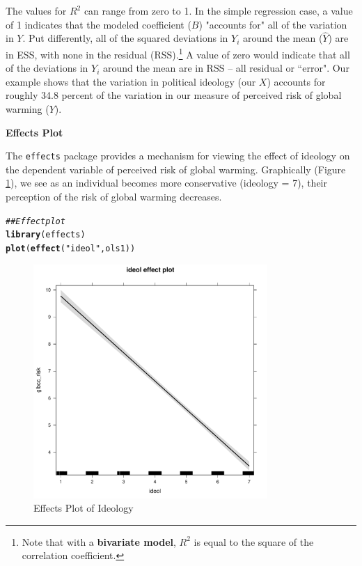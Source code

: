 \documentclass[11pt,openany]{book}\usepackage[]{graphicx}\usepackage[]{color}
\makeatletter
\newcommand{\hlstr}[1]{\textcolor[rgb]{0.192,0.494,0.8}{#1}}%
\newcommand{\hlcom}[1]{\textcolor[rgb]{0.678,0.584,0.686}{\textit{#1}}}%
\newcommand{\hlstd}[1]{\textcolor[rgb]{0.345,0.345,0.345}{#1}}%
\newcommand{\hlkwd}[1]{\textcolor[rgb]{0.737,0.353,0.396}{\textbf{#1}}}%
\newenvironment{kframe}{%
 \def\at@end@of@kframe{}%
 \ifinner\ifhmode%
  \def\at@end@of@kframe{\end{minipage}}%
  \begin{minipage}{\columnwidth}%
 \fi\fi%
 \def\FrameCommand##1{\hskip\@totalleftmargin \hskip-\fboxsep
 \colorbox{shadecolor}{##1}\hskip-\fboxsep
     \hskip-\linewidth \hskip-\@totalleftmargin \hskip\columnwidth}%
 \MakeFramed {\advance\hsize-\width
   \@totalleftmargin\z@ \linewidth\hsize
   \@setminipage}}%
 {\par\unskip\endMakeFramed%
 \at@end@of@kframe}
\newenvironment{knitrout}{}{} %
\renewenvironment{knitrout}{\begin{singlespace}}{\end{singlespace}}
\makeatother
\begin{document}
The values for $R^{2}$ can range from zero to 1. In the simple regression case, a value of 1 indicates that the modeled coefficient ($B$) "accounts for" all of the variation in $Y$. Put differently, all of the squared deviations in $Y_{i}$ around the mean ($\hat{Y}$) are in ESS, with none in the residual (RSS).\footnote{Note that with a \textbf{bivariate model}, $R^{2}$ is equal to the square of the correlation coefficient.} A value of zero would indicate that all of the  deviations in $Y_{i}$ around the mean are in RSS -- all residual or ``error". Our example shows that the variation in political ideology (our $X$) accounts for roughly 34.8 percent of the variation in our measure of perceived risk of global warming ($Y$). 

\noindent  \textbf{Effects Plot}

The \texttt{effects} package provides a mechanism for viewing the effect of ideology on the dependent variable of perceived risk of global warming.  Graphically (Figure \ref{fig:effectsplot}), we see as an individual becomes more conservative (ideology = 7), their perception of the risk of global warming decreases.

\begin{knitrout}
\color{fgcolor}\begin{kframe}
\begin{alltt}
\hlcom{## Effect plot}
\hlkwd{library}\hlstd{(effects)}
\hlkwd{plot}\hlstd{(}\hlkwd{effect}\hlstd{(}\hlstr{"ideol"}\hlstd{, ols1))}
\end{alltt}
\end{kframe}
\end{knitrout}

\begin{figure}[!htp]
\includegraphics[width=3.5in, height=3.5in]{09_InterpretSimple/effectsplot.pdf}%
\caption{Effects Plot of Ideology \label{fig:effectsplot}}
\end{figure} 
\end{document}
